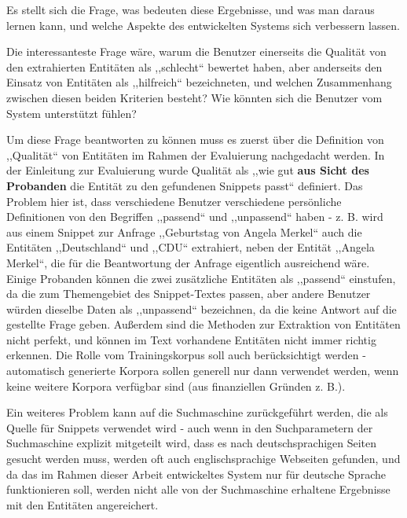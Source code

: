 Es stellt sich die Frage, was bedeuten diese Ergebnisse, und was man daraus lernen kann, und welche Aspekte des entwickelten Systems sich verbessern lassen.

Die interessanteste Frage wäre, warum die Benutzer einerseits die Qualität von den extrahierten Entitäten als ,,schlecht`` bewertet haben, aber anderseits den Einsatz von Entitäten als ,,hilfreich`` bezeichneten, und welchen Zusammenhang zwischen diesen beiden Kriterien besteht? Wie könnten sich die Benutzer vom System unterstützt fühlen?

Um diese Frage beantworten zu können muss es zuerst über die Definition von ,,Qualität`` von Entitäten im Rahmen der Evaluierung nachgedacht werden. In der Einleitung zur Evaluierung wurde Qualität als ,,wie gut \textbf{aus Sicht des Probanden} die Entität zu den gefundenen Snippets passt`` definiert. Das Problem hier ist, dass verschiedene Benutzer verschiedene persönliche Definitionen von den Begriffen ,,passend`` und ,,unpassend`` haben - z. B. wird aus einem Snippet zur Anfrage ,,Geburtstag von Angela Merkel`` auch die Entitäten ,,Deutschland`` und ,,CDU`` extrahiert, neben der Entität ,,Angela Merkel``, die für die Beantwortung der Anfrage eigentlich ausreichend wäre. Einige Probanden können die zwei zusätzliche Entitäten als ,,passend`` einstufen, da die zum Themengebiet des Snippet-Textes passen, aber andere Benutzer würden dieselbe Daten als ,,unpassend`` bezeichnen, da die keine Antwort auf die gestellte Frage geben. Außerdem sind die Methoden zur Extraktion von Entitäten nicht perfekt, und können im Text vorhandene Entitäten nicht immer richtig erkennen. Die Rolle vom Trainingskorpus soll auch berücksichtigt werden - automatisch generierte Korpora sollen generell nur dann verwendet werden, wenn keine weitere Korpora verfügbar sind (aus finanziellen Gründen z. B.).

Ein weiteres Problem kann auf die Suchmaschine zurückgeführt werden, die als Quelle für Snippets verwendet wird - auch wenn in den Suchparametern der Suchmaschine explizit mitgeteilt wird, dass es nach deutschsprachigen Seiten gesucht werden muss, werden oft auch englischsprachige Webseiten gefunden, und da das im Rahmen dieser Arbeit entwickeltes System nur für deutsche Sprache funktionieren soll, werden nicht alle von der Suchmaschine erhaltene Ergebnisse mit den Entitäten angereichert.

